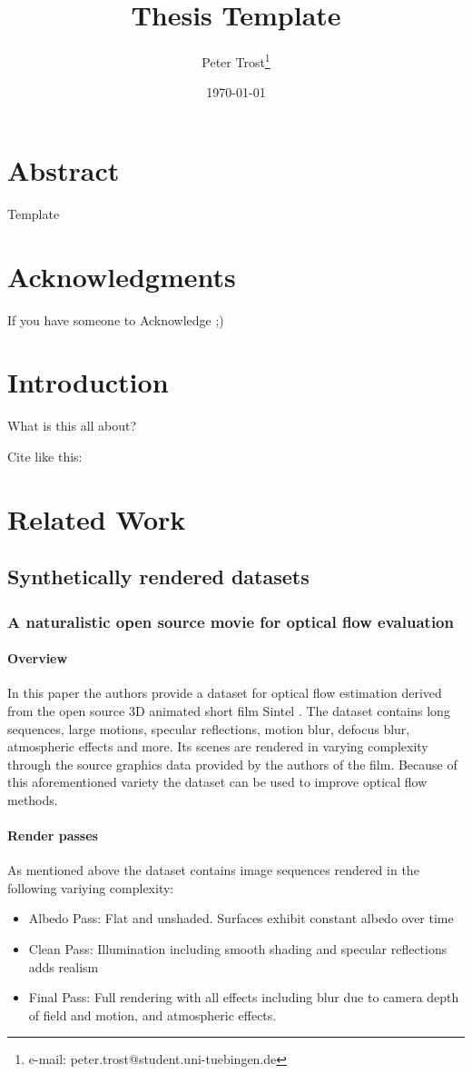 \documentclass[a4paper,cleardoubleempty,BCOR1cm]{scrbook}
\title{Thesis Template}
\author{Peter Trost\thanks{e-mail: peter.trost@student.uni-tuebingen.de}}
\date{\today}
\begin{document}


\chapter*{Abstract}
Template

\chapter*{Acknowledgments}
If you have someone to Acknowledge ;)

\tableofcontents


\chapter{Introduction}
What is this all about?

Cite like this: \cite{agarwal2011}

\chapter{Related Work}
\section{Synthetically rendered datasets}
\subsection{A naturalistic open source movie for optical flow evaluation}
\cite{Butler:ECCV:2012}
\subsubsection{Overview}
In this paper the authors provide a dataset for optical flow estimation derived from the open source 3D animated short film Sintel
.
The dataset contains long sequences, large motions, specular reflections, motion blur, defocus blur, atmospheric effects and more. Its scenes are rendered in varying complexity through the source graphics data provided by the authors of the film. Because of this aforementioned variety the dataset can be used to improve optical flow methods. 

\subsubsection{Render passes}
As mentioned above the dataset contains image sequences rendered in the following variying complexity:\\
\begin{itemize}
	\item Albedo Pass: Flat and unshaded. Surfaces exhibit constant albedo over time
	\item Clean Pass: Illumination including smooth shading and specular reflections adds realism
	\item Final Pass: Full rendering with all effects including blur due to camera depth of field and motion, and atmospheric effects.
\end{itemize}
\end{document}
